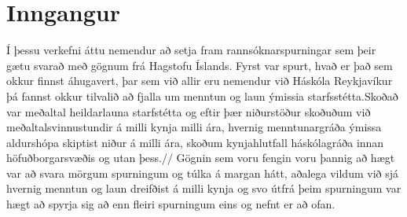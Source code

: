 \documentclass[12pt, git, draft]{rureport}
\begin{document}
\maketitle  %



\section{Inngangur} %

Í þessu verkefni áttu nemendur að setja fram rannsóknarspurningar sem þeir gætu svarað með gögnum frá Hagstofu Íslands. Fyrst var spurt, hvað er það sem okkur finnst áhugavert, þar sem við allir eru nemendur við Háskóla Reykjavíkur þá fannst okkur tilvalið að fjalla um  menntun og laun ýmissia starfsstétta.Skoðað var meðaltal heildarlauna starfstétta og eftir þær niðurstöður skoðuðum við meðaltalsvinnustundir á milli kynja milli ára,  hvernig menntunargráða ýmissa aldurshópa skiptist niður á milli ára, skoðum kynjahlutfall háskólagráða innan höfuðborgarsvæðis og utan þess.//
Gögnin sem voru fengin voru þannig að hægt var að svara mörgum spurningum og túlka á margan hátt, aðalega vildum við sjá hvernig menntun og laun dreifðist á milli kynja og svo útfrá þeim spurningum var hægt að spyrja sig að enn fleiri spurningum eins og nefnt er að ofan.



\end{document}
